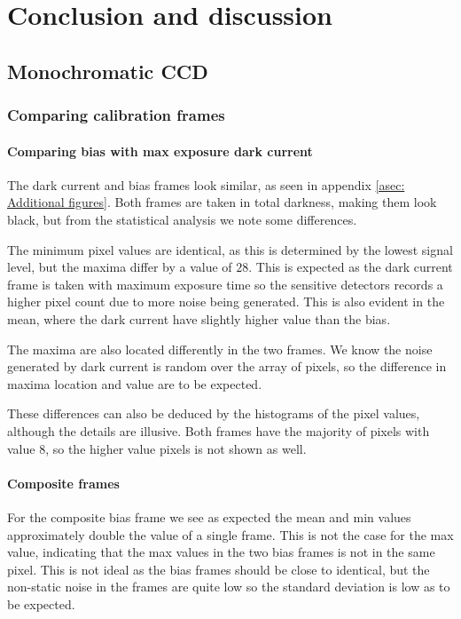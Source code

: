 \documentclass{emulateapj}
\begin{document}
\section{Conclusion and discussion}
\label{sec:conclusion}

\subsection{Monochromatic CCD}
\label{subsec: Conclusion/ Monochromatic}

\subsubsection{Comparing calibration frames}
\label{subsubsec: Conclusion/ Comparing calibration frames}
\paragraph{Comparing bias with max exposure dark current}
The dark current and bias frames look similar, as seen in appendix \ref{asec: Additional figures}. Both frames are taken in total darkness, making them look black, but from the statistical analysis we note some differences.

The minimum pixel values are identical, as this is determined by the lowest signal level, but the maxima differ by a value of $28$. This is expected as the dark current frame is taken with maximum exposure time so the sensitive detectors records a higher pixel count due to more noise being generated. This is also evident in the mean, where the dark current have slightly higher value than the bias.

The maxima are also located differently in the two frames. We know the noise generated by dark current is random over the array of pixels, so the difference in maxima location and value are to be expected.

These differences can also be deduced by the histograms of the pixel values, although the details are illusive. Both frames have the majority of pixels with value $8$, so the higher value pixels is not shown as well. 

\paragraph{Composite frames}
For the composite bias frame we see as expected the mean and min values approximately double the value of a single frame. This is not the case for the max value, indicating that the max values in the two bias frames is not in the same pixel. This is not ideal as the bias frames should be close to identical, but the non-static noise in the frames are quite low so the standard deviation is low as to be expected.
\end{document}
